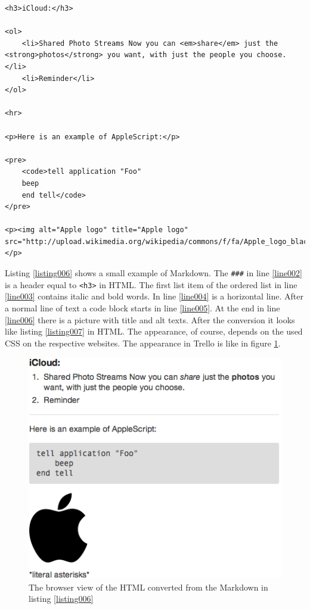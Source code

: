 \begin{lstlisting}[aboveskip=1\baselineskip, style=html, caption=Listing \ref{listing006} converted to HTML., label=listing007]
<h3>iCloud:</h3>

<ol>
	<li>Shared Photo Streams Now you can <em>share</em> just the <strong>photos</strong> you want, with just the people you choose.</li>
	<li>Reminder</li>
</ol>

<hr>

<p>Here is an example of AppleScript:</p>

<pre>
	<code>tell application "Foo"
	beep
	end tell</code>
</pre>

<p><img alt="Apple logo" title="Apple logo" src="http://upload.wikimedia.org/wikipedia/commons/f/fa/Apple_logo_black.svg"></p>
\end{lstlisting} 

Listing \ref{listing006} shows a small example of Markdown. The \lstinline{###} in line \ref{line002} is a header equal to \lstinline{<h3>} in HTML. The first list item of the ordered list in line \ref{line003} contains italic and bold words. In line \ref{line004} is a horizontal line. After a normal line of text a code block starts in line \ref{line005}. At the end in line \ref{line006} there is a picture with title and alt texts. After the conversion it looks like listing \ref{listing007} in HTML. The appearance, of course, depends on the used CSS on the respective websites. The appearance in Trello is like in figure \ref{fig:markdown-result}.

\begin{figure}[htb]
\centering
\includegraphics[scale=0.6]{figures/markdown-result}
\caption{The browser view of the HTML converted from the Markdown in listing \ref{listing006}}
\label{fig:markdown-result}
\end{figure}

